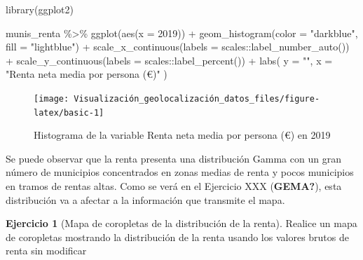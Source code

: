 \documentclass[
]{report}
\newenvironment{Shaded}{\begin{snugshade}}{\end{snugshade}}
\newcommand{\AttributeTok}[1]{\textcolor[rgb]{0.77,0.63,0.00}{#1}}
\newcommand{\FunctionTok}[1]{\textcolor[rgb]{0.00,0.00,0.00}{#1}}
\newcommand{\NormalTok}[1]{#1}
\newcommand{\SpecialCharTok}[1]{\textcolor[rgb]{0.00,0.00,0.00}{#1}}
\newcommand{\StringTok}[1]{\textcolor[rgb]{0.31,0.60,0.02}{#1}}
\theoremstyle{definition}
\theoremstyle{definition}
\theoremstyle{definition}
\newtheorem{exercise}{Ejercicio}[chapter]
\theoremstyle{definition}
\theoremstyle{remark}
\begin{document}
\begin{Shaded}
\begin{Highlighting}[]

\FunctionTok{library}\NormalTok{(ggplot2)}

\NormalTok{munis\_renta }\SpecialCharTok{\%\textgreater{}\%}
  \FunctionTok{ggplot}\NormalTok{(}\FunctionTok{aes}\NormalTok{(}\AttributeTok{x =} \StringTok{\textasciigrave{}}\AttributeTok{2019}\StringTok{\textasciigrave{}}\NormalTok{)) }\SpecialCharTok{+}
  \FunctionTok{geom\_histogram}\NormalTok{(}\AttributeTok{color =} \StringTok{"darkblue"}\NormalTok{, }\AttributeTok{fill =} \StringTok{"lightblue"}\NormalTok{) }\SpecialCharTok{+}
  \FunctionTok{scale\_x\_continuous}\NormalTok{(}\AttributeTok{labels =}\NormalTok{ scales}\SpecialCharTok{::}\FunctionTok{label\_number\_auto}\NormalTok{()) }\SpecialCharTok{+}
  \FunctionTok{scale\_y\_continuous}\NormalTok{(}\AttributeTok{labels =}\NormalTok{ scales}\SpecialCharTok{::}\FunctionTok{label\_percent}\NormalTok{()) }\SpecialCharTok{+}
  \FunctionTok{labs}\NormalTok{(}
    \AttributeTok{y =} \StringTok{""}\NormalTok{,}
    \AttributeTok{x =} \StringTok{"Renta neta media por persona (€)"}
\NormalTok{  )}
\end{Highlighting}
\end{Shaded}

\begin{figure}

{\centering \texttt{[image: Visualización\_geolocalización\_datos\_files/figure-latex/basic-1]} 

}

\caption{Histograma de la variable Renta neta media por persona (€) en 2019}\label{fig:basic}
\end{figure}

Se puede observar que la renta presenta una distribución Gamma con un gran
número de municipios concentrados en zonas medias de renta y pocos municipios en
tramos de rentas altas. Como se verá en el Ejercicio XXX (\textbf{GEMA?}), esta
distribución va a afectar a la información que transmite el mapa.

\begin{exercise}[Mapa de coropletas de la distribución de la renta]
\protect\hypertarget{exr:ex20}{}\label{exr:ex20}Realice un mapa de coropletas mostrando la distribución de la renta usando los
valores brutos de renta sin modificar
\end{exercise}
\end{document}

